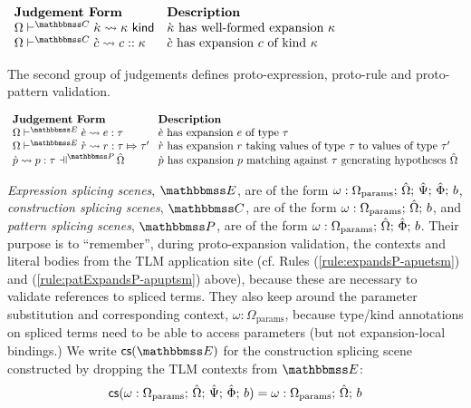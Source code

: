\vspace{10px}\noindent
$\begin{array}{ll}
\textbf{Judgement Form} & \textbf{Description}\\
\cvalidKX{\cekappa}{\kappa} & \text{$\cekappa$ has well-formed expansion $\kappa$}\\
\cvalidCX{\cec}{c}{\kappa} & \text{$\cec$ has expansion $c$ of kind $\kappa$}\\
\end{array}$
\vspace{10px}

The second group of judgements defines proto-expression, proto-rule and proto-pattern validation.

\vspace{10px}\noindent
$\arraycolsep=4pt\begin{array}{ll}
\textbf{Judgement Form} & \textbf{Description}\\
\cvalidEPX{\ce}{e}{\tau} & \text{$\ce$ has expansion $e$ of type $\tau$}\\
\cvalidRP{\Omega}{\escenev}{\crv}{r}{\tau}{\tau'} & \text{$\crv$ has expansion $r$ taking values of type $\tau$ to values of type $\tau'$}\\
\cvalidPPE{\uOmega}{\pscenev}{\cpv}{p}{\tau} & \text{$\cpv$ has expansion $p$ matching against $\tau$ generating hypotheses $\uOmega$}
\end{array}$
\vspace{10px}

\emph{Expression splicing scenes}, $\escenev$, are of the form $\omega : \Omega_\text{params};\,{\hat\Omega};\,\hat{\Psi};\,\hat\Phi;\,b$, \emph{construction splicing scenes}, $\cscenev$, are of the form $\omega : \Omega_\text{params};\,{\hat\Omega};\,b$, and \emph{pattern splicing scenes}, $\pscenev$, are of the form $\omega : \Omega_\text{params};\,{\hat\Omega};\,\hat\Phi;\,b$. Their purpose is to ``remember'', during proto-expansion validation, the contexts and literal bodies from the TLM application site (cf. Rules (\ref{rule:expandsP-apuetsm}) and (\ref{rule:patExpandsP-apuptsm}) above), because these are necessary to validate references to spliced terms. They also keep around the parameter substitution and corresponding context, $\omega : \Omega_\text{params}$, because type/kind annotations on spliced terms need to be able to access parameters (but not expansion-local bindings.) 
We write $\csfrom{\escenev}$ for the construction splicing scene constructed by dropping the TLM contexts from $\escenev$:
\[\mathsf{cs}(\omega : \Omega_\text{params};\,{\hat\Omega};\,\hat{\Psi};\,\hat\Phi;\,b) = \omega : \Omega_\text{params};\,{\hat\Omega};\,b\]

